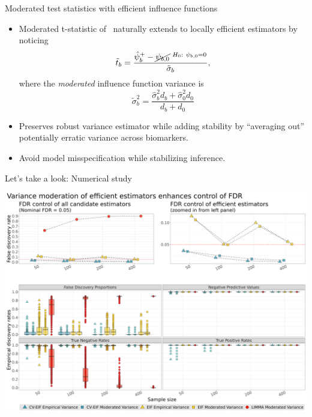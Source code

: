 \documentclass{beamer}
\begin{document}
\begin{frame}[c]{Moderated test statistics with efficient influence functions}

\begin{center}
\begin{itemize}
  \itemsep6pt
  \item Moderated t-statistic of~\cite{smyth2004linear} naturally extends to
    locally efficient estimators by noticing
    \begin{equation*}
      \tilde{t}_b = \frac{\hat{\psi}_b^{+} - \cancel{\psi_{b,0}}{~^{
      \scriptstyle H_0:~\psi_{b,0} = 0}}}
      {\tilde{\sigma}_b},
    \end{equation*}
    where the \textit{moderated} influence function variance is
    \begin{equation*}
      \tilde{\sigma}^2_b = \frac{\hat{\sigma}^2_b d_b + \hat{\sigma}^2_0 d_0}
      {d_b + d_0}
    \end{equation*}
  \item Preserves robust variance estimator while adding stability by
    ``averaging out'' potentially erratic variance across biomarkers.
  \item Avoid model misspecification while stabilizing inference.
\end{itemize}
\end{center}

\note{
}
\end{frame}


\begin{frame}{Let's take a look: Numerical study}

\centering
\includegraphics[origin=c,scale=0.205]{fdr_sl_findings_min_logistic_g0prob_no}

\note{
}
\end{frame}
\end{document}
